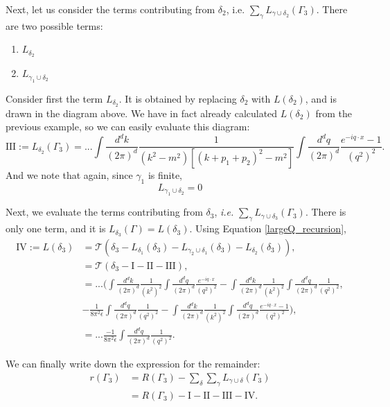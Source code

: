\documentclass{article}
\begin{document}
Next, let us consider the terms contributing from $\delta_2$, i.e. $\sum_{\gamma}L_{\gamma \cup \delta_2}(\Gamma_3)$. There are two possible terms:
\begin{enumerate}
    \item $L_{\delta_2}$
    \item $L_{\gamma_1 \cup \delta_2}$
\end{enumerate}
Consider first the term $L_{\delta_2}$. It is obtained by replacing $\delta_2$ with $L(\delta_2)$, and is drawn in the diagram above. We have in fact already calculated $L(\delta_2)$ from the previous example, so we can easily evaluate this diagram:
\begin{equation}
    \text{III}:=L_{\delta_2}(\Gamma_3)= ...\int\frac{d^dk}{(2\pi)^d}\frac{1}{(k^2-m^2)[(k+p_1+p_2)^2-m^2]}\int\frac{d^dq}{(2\pi)^d}\frac{e^{-iq\cdot x}-1}{(q^2)^2}.
\end{equation}
And we note that again, since $\gamma_1$ is finite, 
\begin{equation}
    L_{\gamma_1 \cup \delta_2} = 0
\end{equation}

Next, we evaluate the terms contributing from $\delta_3$, \textit{i.e.} $\sum_{\gamma}L_{\gamma \cup \delta_3}(\Gamma_3)$. There is only one term, and it is $L_{\delta_3}(\Gamma) = L(\delta_3)$. Using Equation \ref{largeQ_recursion},
\begin{equation}
\begin{split}
    \text{IV}:=L(\delta_3) &= \mathcal{T}(\delta_3-L_{\delta_1}(\delta_3)-L_{\gamma_2 \cup \delta_1}(\delta_3)-L_{\delta_2}(\delta_3)),\\
    &=\mathcal{T}(\delta_3-\text{I}-\text{II}-\text{III}),\\
    &=...(\int\frac{d^dk}{(2\pi)^d}\frac{1}{(k^2)^2}\int\frac{d^dq}{(2\pi)^d}\frac{e^{-iq\cdot x}}{(q^2)^2} - \int\frac{d^dk}{(2\pi)^d}\frac{1}{(k^2)^2}\int\frac{d^dq}{(2\pi)^d}\frac{1}{(q^2)^2}, \\
    &- \frac{1}{8\pi^2 \epsilon}\int\frac{d^dq}{(2\pi)^d}\frac{1}{(q^2)^2}-\int\frac{d^dk}{(2\pi)^d}\frac{1}{(k^2)^2}\int\frac{d^dq}{(2\pi)^d}\frac{e^{-iq\cdot x}-1}{(q^2)^2}),\\
    &= ...\frac{-1}{8\pi^2 \epsilon}\int\frac{d^dq}{(2\pi)^d}\frac{1}{(q^2)^2}.
\end{split}
\end{equation}

We can finally write down the expression for the remainder:
\begin{equation}
\begin{split}
r(\Gamma_3) &= R(\Gamma_3) - \sum_\delta \sum_\gamma L_{\gamma \cup \delta} (\Gamma_3)\\
&=R(\Gamma_3) - \text{I} - \text{II} - \text{III} - \text{IV}.
\end{split}
\end{equation}
\end{document}
